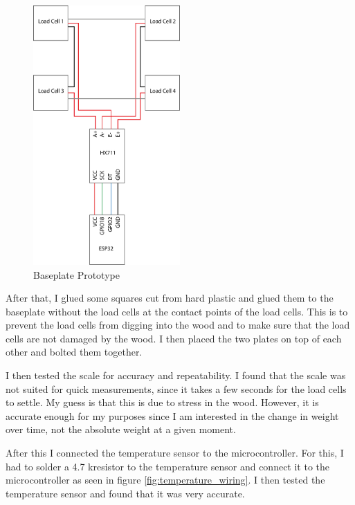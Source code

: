 \begin{figure}
    \centering
    \includegraphics[width=0.5\textwidth]{figures/loadcell_wiring.png}
    \caption{Baseplate Prototype}
    \label{fig:loadcell_wiring}
\end{figure}

After that, I glued some squares cut from hard plastic and glued them to the baseplate without the load cells at the contact points of the load cells. This is to prevent the load cells from digging into the wood and to make sure that the load cells are not damaged by the wood. I then placed the two plates on top of each other and bolted them together.

I then tested the scale for accuracy and repeatability. I found that the scale was not suited for quick measurements, since it takes a few seconds for the load cells to settle. My guess is that this is due to stress in the wood. However, it is accurate enough for my purposes since I am interested in the change in weight over time, not the absolute weight at a given moment.

After this I connected the temperature sensor to the microcontroller. For this, I had to solder a 4.7 k\Omega resistor to the temperature sensor and connect it to the microcontroller as seen in figure \ref{fig:temperature_wiring}. I then tested the temperature sensor and found that it was very accurate.

